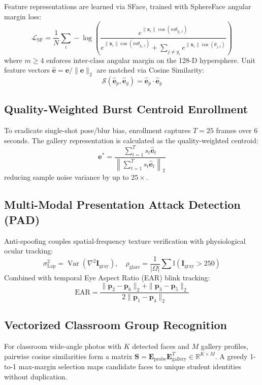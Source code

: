 \documentclass[journal,10pt,twocolumn]{IEEEtran}
\begin{document}
Feature representations are learned via SFace, trained with SphereFace angular margin loss:
\begin{equation}
\mathcal{L}_{\text{SF}} = \frac{1}{N} \sum_i -\log\left( \frac{e^{\|\mathbf{x}_i\| \cos(m \theta_{y_i, i})}}{e^{\|\mathbf{x}_i\| \cos(m \theta_{y_i, i})} + \sum_{j \neq y_i} e^{\|\mathbf{x}_i\| \cos(\theta_{j, i})}} \right)
\end{equation}
where $m \ge 4$ enforces inter-class angular margin on the 128-D hypersphere. Unit feature vectors $\hat{\mathbf{e}} = \mathbf{e} / \|\mathbf{e}\|_2$ are matched via Cosine Similarity:
\begin{equation}
\mathcal{S}(\hat{\mathbf{e}}_p, \hat{\mathbf{e}}_g) = \hat{\mathbf{e}}_p \cdot \hat{\mathbf{e}}_g
\end{equation}

\subsection{Quality-Weighted Burst Centroid Enrollment}
To eradicate single-shot pose/blur bias, enrollment captures $T = 25$ frames over 6 seconds. The gallery representation is calculated as the quality-weighted centroid:
\begin{equation}
\mathbf{e}^* = \frac{\sum_{t=1}^T s_t \hat{\mathbf{e}}_t}{\left\| \sum_{t=1}^T s_t \hat{\mathbf{e}}_t \right\|_2}
\end{equation}
reducing sample noise variance by up to $25\times$.

\subsection{Multi-Modal Presentation Attack Detection (PAD)}
Anti-spoofing couples spatial-frequency texture verification with physiological ocular tracking:
\begin{equation}
\sigma^2_{\text{Lap}} = \operatorname{Var}\left( \nabla^2 \mathbf{I}_{\text{gray}} \right), \quad \rho_{\text{glare}} = \frac{1}{|\Omega|} \sum \mathbb{I}(\mathbf{I}_{\text{gray}} > 250)
\end{equation}
Combined with temporal Eye Aspect Ratio (EAR) blink tracking:
\begin{equation}
\text{EAR} = \frac{\|\mathbf{p}_2 - \mathbf{p}_6\|_2 + \|\mathbf{p}_3 - \mathbf{p}_5\|_2}{2 \|\mathbf{p}_1 - \mathbf{p}_4\|_2}
\end{equation}

\subsection{Vectorized Classroom Group Recognition}
For classroom wide-angle photos with $K$ detected faces and $M$ gallery profiles, pairwise cosine similarities form a matrix $\mathbf{S} = \mathbf{E}_{\text{probe}} \mathbf{E}_{\text{gallery}}^T \in \mathbb{R}^{K \times M}$. A greedy 1-to-1 max-margin selection maps candidate faces to unique student identities without duplication.
\end{document}
